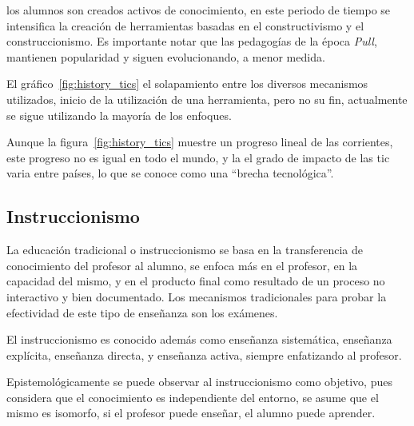  los alumnos son creados activos de
conocimiento\cite{white:ict,leinonen:ict}, en este periodo de tiempo se
intensifica la creación de herramientas basadas en el constructivismo y el
construccionismo. Es importante notar que las pedagogías de la época
\textit{Pull}, mantienen popularidad y siguen evolucionando,  a menor medida\cite{white:ict}.

El gráfico~\ref{fig:history_tics}  el solapamiento entre los diversos
mecanismos utilizados,  inicio de la utilización de una herramienta,
pero no su fin, actualmente se sigue utilizando la mayoría de los
enfoques\cite{leinonen:ict}.

Aunque la figura~\ref{fig:history_tics} muestre un progreso lineal de las
corrientes, este progreso no es igual en todo el mundo, y la el grado de
impacto de las \Gls{tic} varia entre países, lo que se conoce como una
\enquote{brecha tecnológica}. 


\subsection{Instruccionismo}

La educación tradicional o instruccionismo se basa en la transferencia de
conocimiento del profesor al alumno, se enfoca más en el profesor, en la
capacidad del mismo, y en el producto final como resultado de un proceso no
interactivo y bien
documentado\cite{igi:instructionism,johnson2005instructionism}. Los mecanismos
tradicionales para probar la efectividad de este tipo de enseñanza son los
exámenes.

El instruccionismo es conocido además como enseñanza sistemática, enseñanza
explícita, enseñanza directa, y enseñanza activa, siempre enfatizando al
profesor\cite{johnson2005instructionism}.

Epistemológicamente se puede observar al instruccionismo como objetivo, pues
considera que el conocimiento es independiente del entorno, se asume que el
mismo es isomorfo, si el profesor puede enseñar, el alumno puede
aprender\cite{johnson2005instructionism}.

